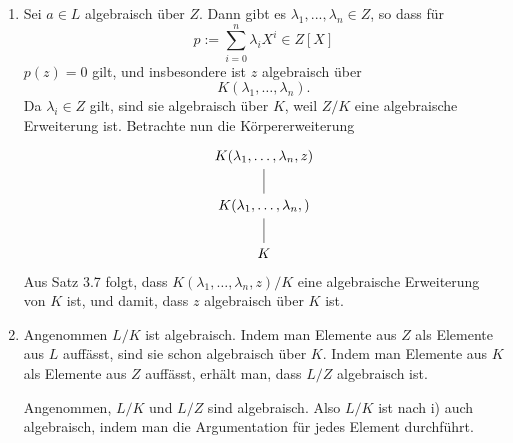 \setcounter{sol}{1}
\begin{gsol}
  \begin{enumerate}
    \item Sei $a\in L$ algebraisch über $Z$. Dann gibt es $\lambda_1,...,\lambda_n\in Z$, so dass für
    \[
    p:= \sum_{i=0}^n \lambda_iX^i \in Z[X]
    \]
    $p(z)=0$ gilt, und insbesondere ist $z$ algebraisch über
    \[
      K(\lambda_1,\hdots,\lambda_n).
    \]
     Da $\lambda_i\in Z$ gilt, sind sie algebraisch über $K$, weil $Z/K$ eine algebraische Erweiterung ist. Betrachte nun die Körpererweiterung
    \[
    \begin{tikzcd}
      K(\lambda_1,\hdots,\lambda_n,z)\ar[dash]{d}\\
      K(\lambda_1,\hdots,\lambda_n,)\ar[dash]{d}\\
      K
    \end{tikzcd}
    \]
    Aus Satz 3.7 folgt, dass $K(\lambda_1,\hdots,\lambda_n,z)/K$ eine algebraische Erweiterung von $K$ ist, und damit, dass $z$ algebraisch über $K$ ist.
    \item Angenommen $L/K$ ist algebraisch. Indem man Elemente aus $Z$ als Elemente aus $L$ auffässt, sind sie schon algebraisch über $K$. Indem man Elemente aus $K$ als Elemente aus $Z$ auffässt, erhält man, dass $L/Z$ algebraisch ist.\par
    Angenommen, $L/K$ und $L/Z$ sind algebraisch. Also $L/K$ ist nach i) auch algebraisch, indem man die Argumentation für jedes Element durchführt.
  \end{enumerate}
\end{gsol}

